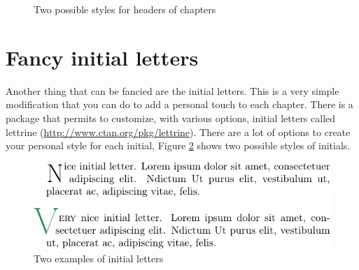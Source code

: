 \begin{center}
\begin{figure}[h]
\begin{centering}
\par\end{centering}
\begin{centering}
\par\end{centering}
\caption{\label{fig:fancy-headers}Two possible styles for headers of chapters}
\end{figure}
\par\end{center}

\section{Fancy initial letters}

Another thing that can be fancied are the initial letters. This is
a very simple modification that you can do to add a personal touch
to each chapter. There is a package that permits to customize, with
various options, initial letters called \textsf{lettrine} (\url{http://www.ctan.org/pkg/lettrine}).
There are a lot of options to create your personal style for each
initial, Figure \ref{fig:initial-letters} shows two possible styles
of initials.

\begin{center}
\begin{figure}[h]
\begin{centering}
\includegraphics{chapter-4/images/lettrine}
\par\end{centering}
\caption{\label{fig:initial-letters}Two examples of initial letters}
\end{figure}
\par\end{center}

